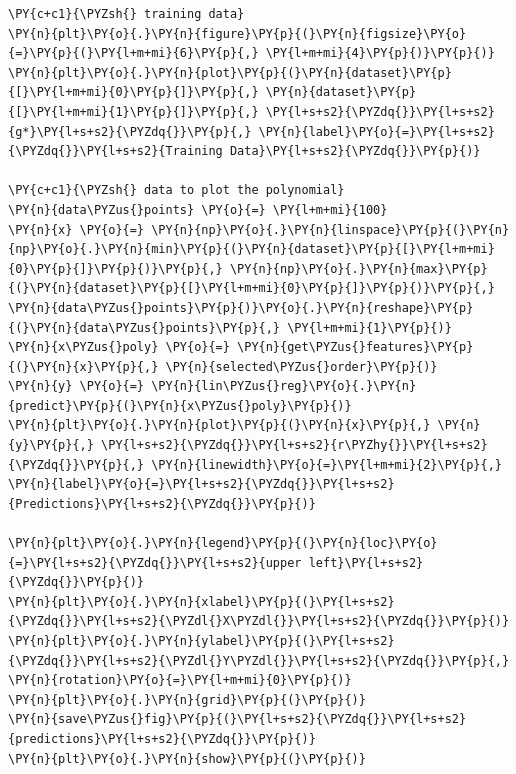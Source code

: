 \documentclass[a4paper,11pt]{article}%
\begin{document}
    \begin{tcolorbox}[breakable, size=fbox, boxrule=1pt, pad at break*=1mm,colback=cellbackground, colframe=cellborder]
\begin{Verbatim}[commandchars=\\\{\}]
\PY{c+c1}{\PYZsh{} training data}
\PY{n}{plt}\PY{o}{.}\PY{n}{figure}\PY{p}{(}\PY{n}{figsize}\PY{o}{=}\PY{p}{(}\PY{l+m+mi}{6}\PY{p}{,} \PY{l+m+mi}{4}\PY{p}{)}\PY{p}{)}
\PY{n}{plt}\PY{o}{.}\PY{n}{plot}\PY{p}{(}\PY{n}{dataset}\PY{p}{[}\PY{l+m+mi}{0}\PY{p}{]}\PY{p}{,} \PY{n}{dataset}\PY{p}{[}\PY{l+m+mi}{1}\PY{p}{]}\PY{p}{,} \PY{l+s+s2}{\PYZdq{}}\PY{l+s+s2}{g*}\PY{l+s+s2}{\PYZdq{}}\PY{p}{,} \PY{n}{label}\PY{o}{=}\PY{l+s+s2}{\PYZdq{}}\PY{l+s+s2}{Training Data}\PY{l+s+s2}{\PYZdq{}}\PY{p}{)}

\PY{c+c1}{\PYZsh{} data to plot the polynomial}
\PY{n}{data\PYZus{}points} \PY{o}{=} \PY{l+m+mi}{100}
\PY{n}{x} \PY{o}{=} \PY{n}{np}\PY{o}{.}\PY{n}{linspace}\PY{p}{(}\PY{n}{np}\PY{o}{.}\PY{n}{min}\PY{p}{(}\PY{n}{dataset}\PY{p}{[}\PY{l+m+mi}{0}\PY{p}{]}\PY{p}{)}\PY{p}{,} \PY{n}{np}\PY{o}{.}\PY{n}{max}\PY{p}{(}\PY{n}{dataset}\PY{p}{[}\PY{l+m+mi}{0}\PY{p}{]}\PY{p}{)}\PY{p}{,} \PY{n}{data\PYZus{}points}\PY{p}{)}\PY{o}{.}\PY{n}{reshape}\PY{p}{(}\PY{n}{data\PYZus{}points}\PY{p}{,} \PY{l+m+mi}{1}\PY{p}{)}
\PY{n}{x\PYZus{}poly} \PY{o}{=} \PY{n}{get\PYZus{}features}\PY{p}{(}\PY{n}{x}\PY{p}{,} \PY{n}{selected\PYZus{}order}\PY{p}{)}
\PY{n}{y} \PY{o}{=} \PY{n}{lin\PYZus{}reg}\PY{o}{.}\PY{n}{predict}\PY{p}{(}\PY{n}{x\PYZus{}poly}\PY{p}{)}
\PY{n}{plt}\PY{o}{.}\PY{n}{plot}\PY{p}{(}\PY{n}{x}\PY{p}{,} \PY{n}{y}\PY{p}{,} \PY{l+s+s2}{\PYZdq{}}\PY{l+s+s2}{r\PYZhy{}}\PY{l+s+s2}{\PYZdq{}}\PY{p}{,} \PY{n}{linewidth}\PY{o}{=}\PY{l+m+mi}{2}\PY{p}{,} \PY{n}{label}\PY{o}{=}\PY{l+s+s2}{\PYZdq{}}\PY{l+s+s2}{Predictions}\PY{l+s+s2}{\PYZdq{}}\PY{p}{)}

\PY{n}{plt}\PY{o}{.}\PY{n}{legend}\PY{p}{(}\PY{n}{loc}\PY{o}{=}\PY{l+s+s2}{\PYZdq{}}\PY{l+s+s2}{upper left}\PY{l+s+s2}{\PYZdq{}}\PY{p}{)}
\PY{n}{plt}\PY{o}{.}\PY{n}{xlabel}\PY{p}{(}\PY{l+s+s2}{\PYZdq{}}\PY{l+s+s2}{\PYZdl{}X\PYZdl{}}\PY{l+s+s2}{\PYZdq{}}\PY{p}{)}
\PY{n}{plt}\PY{o}{.}\PY{n}{ylabel}\PY{p}{(}\PY{l+s+s2}{\PYZdq{}}\PY{l+s+s2}{\PYZdl{}Y\PYZdl{}}\PY{l+s+s2}{\PYZdq{}}\PY{p}{,} \PY{n}{rotation}\PY{o}{=}\PY{l+m+mi}{0}\PY{p}{)}
\PY{n}{plt}\PY{o}{.}\PY{n}{grid}\PY{p}{(}\PY{p}{)}
\PY{n}{save\PYZus{}fig}\PY{p}{(}\PY{l+s+s2}{\PYZdq{}}\PY{l+s+s2}{predictions}\PY{l+s+s2}{\PYZdq{}}\PY{p}{)}
\PY{n}{plt}\PY{o}{.}\PY{n}{show}\PY{p}{(}\PY{p}{)}
\end{Verbatim}
\end{tcolorbox}
\end{document}
